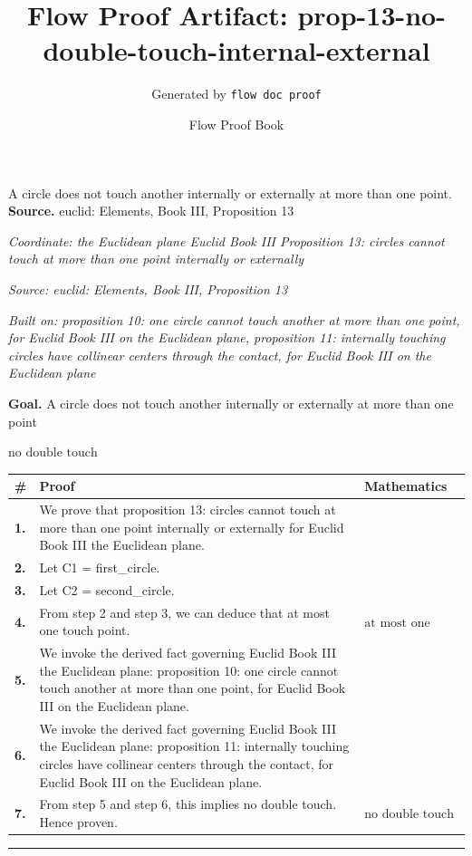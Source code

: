 \documentclass[11pt]{article}
\title{Flow Proof Artifact: prop-13-no-double-touch-internal-external}
\author{Generated by \texttt{flow doc proof}}
\date{Flow Proof Book}
\theoremstyle{definition}
\begin{document}
\maketitle
A circle does not touch another internally or externally at more than one point.\\[0.5em]
\textbf{Source.} euclid: Elements, Book III, Proposition 13\\[0.5em]
\bigskip
{}\par
\smallskip\noindent\textit{Coordinate: the Euclidean plane \cdot Euclid Book III \cdot Proposition 13: circles cannot touch at more than one point internally or externally}\par
\smallskip\noindent\textit{Source: euclid: Elements, Book III, Proposition 13}\par
\smallskip\noindent\textit{Built on: proposition 10: one circle cannot touch another at more than one point, for Euclid Book III on the Euclidean plane, proposition 11: internally touching circles have collinear centers through the contact, for Euclid Book III on the Euclidean plane}\par
\medskip
\noindent\textbf{Goal.} A circle does not touch another internally or externally at more than one point\par
\noindent$\displaystyle \text{no double touch}$\par
\medskip
\noindent
\begin{tabular}{@{} >{\raggedright\arraybackslash}p{} >{\raggedright\arraybackslash}p{} >{\raggedleft\arraybackslash}p{} @{}}
\textbf{\#} & \textbf{Proof} & \textbf{Mathematics} \\
\midrule
\textbf{1.} & We prove that proposition 13: circles cannot touch at more than one point internally or externally for Euclid Book III the Euclidean plane. & \\[0.45em]
\textbf{2.} & Let C1 = first\_circle. & \\[0.45em]
\textbf{3.} & Let C2 = second\_circle. & \\[0.45em]
\textbf{4.} & From step 2 and step 3, we can deduce that at most one touch point. & $\displaystyle \text{at most one touch point}$ \\[0.45em]
\textbf{5.} & We invoke the derived fact governing Euclid Book III the Euclidean plane: proposition 10: one circle cannot touch another at more than one point, for Euclid Book III on the Euclidean plane. & \\[0.45em]
\textbf{6.} & We invoke the derived fact governing Euclid Book III the Euclidean plane: proposition 11: internally touching circles have collinear centers through the contact, for Euclid Book III on the Euclidean plane. & \\[0.45em]
\textbf{7.} & From step 5 and step 6, this implies no double touch. Hence proven. & $\displaystyle \text{no double touch}$ \\[0.45em]
\bottomrule
\end{tabular}
\label{thm:Geometry-Euclid Book III-proposition_13_circles_cannot_touch_at_more_than_one_point_internally_or_externally}
\par\medskip\hrule
\end{document}
